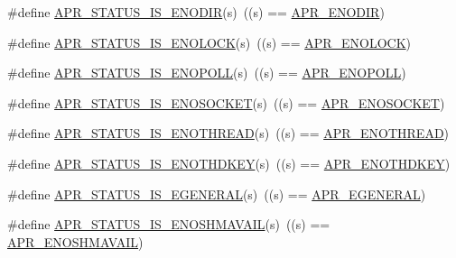 \begin{DoxyCompactItemize}
\item 
\#define \mbox{\hyperlink{group___a_p_r___s_t_a_t_u_s___i_s_ga666c0bcfb97d26df7e7e360041d93fc6}{A\+P\+R\+\_\+\+S\+T\+A\+T\+U\+S\+\_\+\+I\+S\+\_\+\+E\+N\+O\+D\+IR}}(s)~((s) == \mbox{\hyperlink{group___a_p_r___error_ga9a8077e85b6241c1e91b69548395fc09}{A\+P\+R\+\_\+\+E\+N\+O\+D\+IR}})
\item 
\#define \mbox{\hyperlink{group___a_p_r___s_t_a_t_u_s___i_s_gaced66cdb08529210dbf2f6bcbba99258}{A\+P\+R\+\_\+\+S\+T\+A\+T\+U\+S\+\_\+\+I\+S\+\_\+\+E\+N\+O\+L\+O\+CK}}(s)~((s) == \mbox{\hyperlink{group___a_p_r___error_ga9c411624c42f7562a5c6c3461bdcb0ec}{A\+P\+R\+\_\+\+E\+N\+O\+L\+O\+CK}})
\item 
\#define \mbox{\hyperlink{group___a_p_r___s_t_a_t_u_s___i_s_ga590bc2090fe120d142853dec27eaf9e8}{A\+P\+R\+\_\+\+S\+T\+A\+T\+U\+S\+\_\+\+I\+S\+\_\+\+E\+N\+O\+P\+O\+LL}}(s)~((s) == \mbox{\hyperlink{group___a_p_r___error_gaeff8d4ed7bf9b99cbe62a3e7068e85b7}{A\+P\+R\+\_\+\+E\+N\+O\+P\+O\+LL}})
\item 
\#define \mbox{\hyperlink{group___a_p_r___s_t_a_t_u_s___i_s_gae415d3119f7b13edc8af627a5e3f440b}{A\+P\+R\+\_\+\+S\+T\+A\+T\+U\+S\+\_\+\+I\+S\+\_\+\+E\+N\+O\+S\+O\+C\+K\+ET}}(s)~((s) == \mbox{\hyperlink{group___a_p_r___error_ga99e125e203a1d44f12bd88b41696716d}{A\+P\+R\+\_\+\+E\+N\+O\+S\+O\+C\+K\+ET}})
\item 
\#define \mbox{\hyperlink{group___a_p_r___s_t_a_t_u_s___i_s_gaf33e51e4df639e2b93c99a2fa8b5c7e7}{A\+P\+R\+\_\+\+S\+T\+A\+T\+U\+S\+\_\+\+I\+S\+\_\+\+E\+N\+O\+T\+H\+R\+E\+AD}}(s)~((s) == \mbox{\hyperlink{group___a_p_r___error_ga7b43e1e075ff031e142aa809295ee441}{A\+P\+R\+\_\+\+E\+N\+O\+T\+H\+R\+E\+AD}})
\item 
\#define \mbox{\hyperlink{group___a_p_r___s_t_a_t_u_s___i_s_ga782b37d892214ee60911062791871ae2}{A\+P\+R\+\_\+\+S\+T\+A\+T\+U\+S\+\_\+\+I\+S\+\_\+\+E\+N\+O\+T\+H\+D\+K\+EY}}(s)~((s) == \mbox{\hyperlink{group___a_p_r___error_ga29faf801fac647a14360e7493f7fd74e}{A\+P\+R\+\_\+\+E\+N\+O\+T\+H\+D\+K\+EY}})
\item 
\#define \mbox{\hyperlink{group___a_p_r___s_t_a_t_u_s___i_s_gab015701a084807912b3c0464c6badf1a}{A\+P\+R\+\_\+\+S\+T\+A\+T\+U\+S\+\_\+\+I\+S\+\_\+\+E\+G\+E\+N\+E\+R\+AL}}(s)~((s) == \mbox{\hyperlink{group___a_p_r___error_ga18f5678bea0c2c704a2b6a186c9e158b}{A\+P\+R\+\_\+\+E\+G\+E\+N\+E\+R\+AL}})
\item 
\#define \mbox{\hyperlink{group___a_p_r___s_t_a_t_u_s___i_s_ga99af86378a3ac8eb5a59f1acffec6440}{A\+P\+R\+\_\+\+S\+T\+A\+T\+U\+S\+\_\+\+I\+S\+\_\+\+E\+N\+O\+S\+H\+M\+A\+V\+A\+IL}}(s)~((s) == \mbox{\hyperlink{group___a_p_r___error_ga67516f4e87197490333480a8bbc78725}{A\+P\+R\+\_\+\+E\+N\+O\+S\+H\+M\+A\+V\+A\+IL}})

\end{DoxyCompactItemize}

